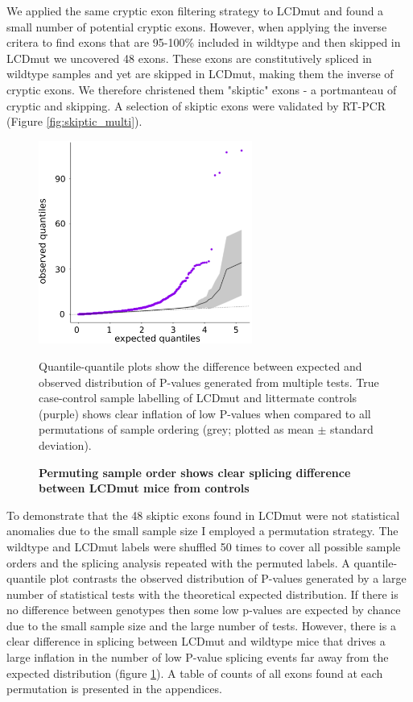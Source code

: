 We applied the same cryptic exon filtering strategy to LCDmut and found a small number of potential cryptic exons. However, when applying the inverse critera to find exons that are 95-100\% included in wildtype and then skipped in LCDmut we uncovered 48 exons. These exons are constitutively spliced in wildtype samples and yet are skipped in LCDmut, making them the inverse of cryptic exons. We therefore christened them "skiptic" exons - a portmanteau of cryptic and skipping. A selection of skiptic exons were validated by RT-PCR (Figure \ref{fig:skiptic_multi}). 


\begin{figure}[h!]
	\centering
	\includegraphics[width=7cm]{Figures/05_tdp_mice/permutation_ribbon.png}
	\caption{\textbf{Permuting sample order shows clear splicing difference between LCDmut mice from controls}}
	Quantile-quantile plots show the difference between expected and observed distribution of P-values generated from multiple tests. True case-control sample labelling of LCDmut and littermate controls (purple) shows clear inflation of low P-values when compared to all permutations of sample ordering (grey; plotted as mean $\pm$ standard deviation).
	\label{fig:permutation}
\end{figure}

To demonstrate that the 48 skiptic exons found in LCDmut were not statistical anomalies due to the small sample size I employed a permutation strategy.
 The wildtype and LCDmut labels were shuffled 50 times to cover all possible sample orders and the splicing analysis repeated with the permuted labels. 
A quantile-quantile plot contrasts the observed distribution of P-values generated by a large number of statistical tests with the theoretical expected distribution. 
If there is no difference between genotypes then some low p-values are expected by chance due to the small sample size and the large number of tests. 
However, there is a clear difference in splicing between LCDmut and wildtype mice that drives a large inflation in the number of low P-value splicing events far away from the expected distribution (figure \ref{fig:permutation}).
A table of counts of all exons found at each permutation is presented in the appendices.   


